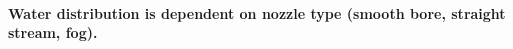 \documentclass{article}
\begin{document}

\clearpage

\paragraph{Water distribution is dependent on nozzle type (smooth bore, straight stream, fog).} \mbox{}


\end{document}

